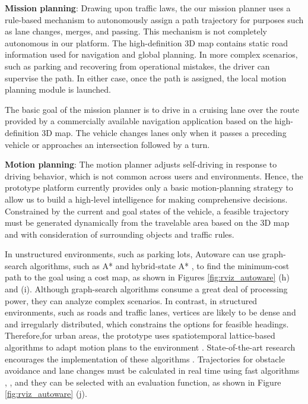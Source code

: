 \textbf{Mission planning}:
Drawing upon traffic laws, the our mission planner uses a rule-based mechanism to autonomously assign a path trajectory for purposes such as lane changes, merges, and passing.
This mechanism is not completely autonomous in our platform.
The high-definition 3D map contains static road information used for navigation and global planning.
In more complex scenarios, such as parking and recovering from operational mistakes, the driver can supervise the path.
In either case, once the path is assigned, the local motion planning module is launched.

The basic goal of the mission planner is to drive in a cruising lane over the route provided by a commercially available navigation application based on the high-definition 3D map.
The vehicle changes lanes only when it passes a preceding vehicle or approaches an intersection followed by a turn.

\textbf{Motion planning}:
The motion planner adjusts self-driving in response to driving behavior, which is not common across users and environments.
Hence, the prototype platform currently provides only a basic motion-planning strategy to allow us to build a high-level intelligence for making comprehensive decisions.
Constrained by the current and goal states of the vehicle, a feasible trajectory must be generated dynamically from the travelable area based on the 3D map and with consideration of surrounding objects and traffic rules.

In unstructured environments, such as parking lots, Autoware can use graph-search algorithms, such as A* \cite{hart1968formal} and hybrid-state A* \cite{dolgov2010path}, to find the minimum-cost path to the goal using a cost map, as shown in Figures \ref{fig:rviz_autoware} (h) and (i).
Although graph-search algorithms consume a great deal of processing power, they can analyze complex scenarios.
In contrast, in structured environments, such as roads and traffic lanes, vertices are likely to be dense and and irregularly distributed, which constrains the options for feasible headings.
Therefore,for urban areas, the prototype uses spatiotemporal lattice-based algorithms to adapt motion plans to the environment \cite{mcnaughton2011motion}.
State-of-the-art research encourages the implementation of these algorithms \cite{urmson2008autonomous}.
Trajectories for obstacle avoidance and lane changes must be calculated in real time using fast algorithms \cite{pivtoraiko2009differentially}, \cite{mcnaughton2011motion}, and they can be selected with an evaluation function, as shown in Figure \ref{fig:rviz_autoware} (j).

